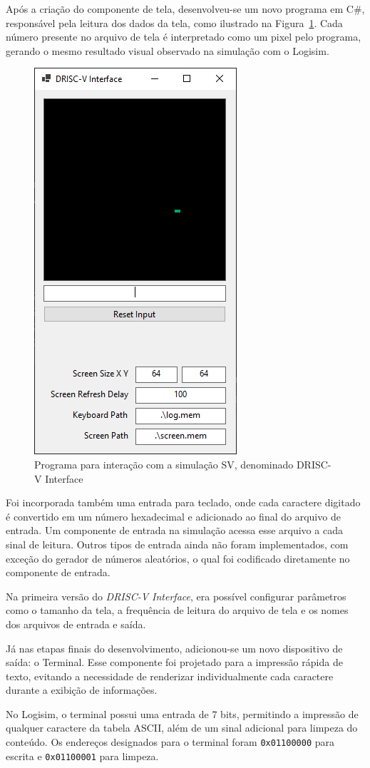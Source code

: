 \documentclass[
	12pt,				%
	openright,			%
	oneside,			%
	a4paper,			%
	english,			%
	french,				%
	spanish,			%
	brazil,				%
	]{abntex2}
\begin{document}
Após a criação do componente de tela, desenvolveu-se um novo programa em C\#, responsável pela leitura dos dados da tela, como ilustrado na Figura~\ref{fig:DRISC-V_interface}. Cada número presente no arquivo de tela é interpretado como um pixel pelo programa, gerando o mesmo resultado visual observado na simulação com o Logisim.

\begin{figure}[h]
    \centering
    \includegraphics[width=0.25\linewidth]{ProcessoDesenvolvimento/Arquitetura/DriscV_Interface.png}
    \caption{Programa para interação com a simulação SV, denominado DRISC-V Interface}
    \label{fig:DRISC-V_interface}
\end{figure}

Foi incorporada também uma entrada para teclado, onde cada caractere digitado é convertido em um número hexadecimal e adicionado ao final do arquivo de entrada. Um componente de entrada na simulação acessa esse arquivo a cada sinal de leitura. Outros tipos de entrada ainda não foram implementados, com exceção do gerador de números aleatórios, o qual foi codificado diretamente no componente de entrada.

Na primeira versão do \textit{DRISC-V Interface}, era possível configurar parâmetros como o tamanho da tela, a frequência de leitura do arquivo de tela e os nomes dos arquivos de entrada e saída.

Já nas etapas finais do desenvolvimento, adicionou-se um novo dispositivo de saída: o Terminal. Esse componente foi projetado para a impressão rápida de texto, evitando a necessidade de renderizar individualmente cada caractere durante a exibição de informações.

No Logisim, o terminal possui uma entrada de 7 bits, permitindo a impressão de qualquer caractere da tabela ASCII, além de um sinal adicional para limpeza do conteúdo. Os endereços designados para o terminal foram \texttt{0x01100000} para escrita e \texttt{0x01100001} para limpeza.
\end{document}
